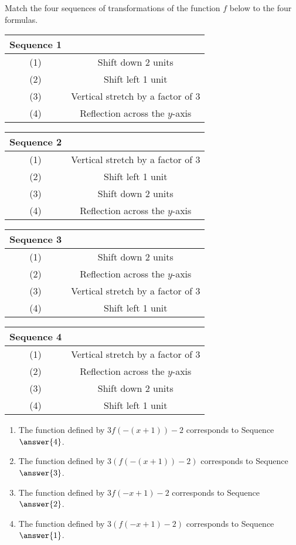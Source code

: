 \documentclass{ximera}
\author{Kenneth Berglund}
\begin{document}
\begin{exercise}
Match the four sequences of transformations of the function $f$ below to the four formulas.

\begin{tabular}{cc}
Sequence 1\\
\hline
(1) & Shift down 2 units \\
(2) & Shift left 1 unit \\
(3) & Vertical stretch by a factor of 3 \\
(4) & Reflection across the $y$-axis
\end{tabular}
\quad
\begin{tabular}{cc}
Sequence 2\\
\hline
(1) & Vertical stretch by a factor of 3 \\
(2) & Shift left 1 unit \\
(3) &  Shift down 2 units\\
(4) & Reflection across the $y$-axis
\end{tabular}
\quad
\begin{tabular}{cc}
Sequence 3\\
\hline
(1) & Shift down 2 units \\
(2) & Reflection across the $y$-axis \\
(3) & Vertical stretch by a factor of 3 \\
(4) & Shift left 1 unit
\end{tabular}
\quad
\begin{tabular}{cc}
Sequence 4\\
\hline
(1) & Vertical stretch by a factor of 3\\
(2) & Reflection across the $y$-axis \\
(3) & Shift down 2 units \\
(4) & Shift left 1 unit
\end{tabular}

\begin{enumerate}
\item The function defined by $3f(-(x + 1)) - 2$ corresponds to Sequence $\answer{4}$.
\item The function defined by $3(f(-(x + 1)) - 2)$ corresponds to Sequence $\answer{3}$.
\item The function defined by $3f(-x + 1) - 2$ corresponds to Sequence $\answer{2}$.
\item The function defined by $3(f(-x + 1) - 2)$ corresponds to Sequence $\answer{1}$.
\end{enumerate} 
\end{exercise}
\end{document}
